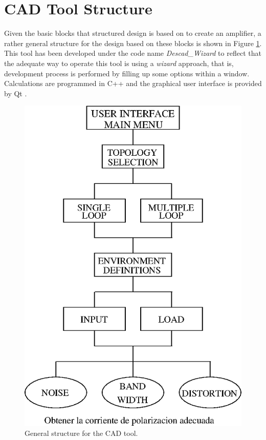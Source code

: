 \documentclass[twocolumn]{IEEEtran}
\begin{document}
\section{CAD Tool Structure}
Given the basic blocks that structured design is based on to create an amplifier, a rather general structure for the design based on these blocks is shown in Figure \ref{fig:descad}. This tool has been developed under the code name {\it Descad\_Wizard} to reflect that the adequate way to operate this tool is using a {\it wizard} approach, that is, development process is performed by filling up some options within a window. Calculations are programmed in C++ \cite{joyanes} and the graphical user interface is provided by Qt \cite{qt}. 

\begin{figure}[hbtp]
	\centering
	\includegraphics[scale=0.5]{figures/descad_1.eps}
	\caption{General structure for the CAD tool.}
	\label{fig:descad}
\end{figure}
\end{document}
